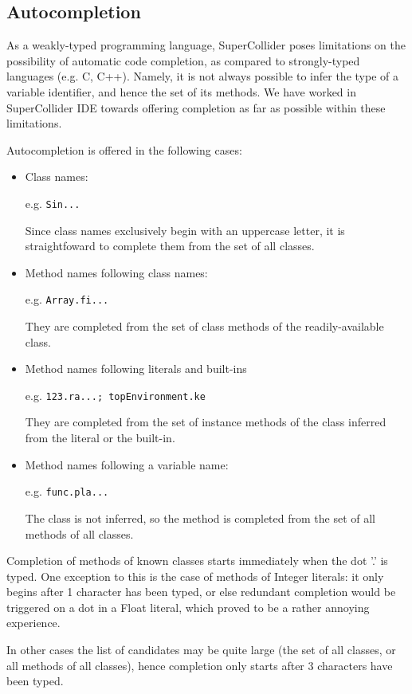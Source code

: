 \documentclass[11pt,a4paper]{article}
\begin{document}
\subsection{Autocompletion}

As a weakly-typed programming language, SuperCollider poses limitations on the possibility of
automatic code completion, as compared to strongly-typed languages (e.g. C, C++). Namely, it is
not always possible to infer the type of a variable identifier, and hence the set of its methods. We
have worked in SuperCollider IDE towards offering completion as far as possible within these limitations.

Autocompletion is offered in the following cases:
\begin{itemize}
 \item Class names:
 
 e.g. \verb|Sin...|
 
 Since class names exclusively begin with an uppercase letter, it is straightfoward
 to complete them from the set of all classes.
 
 \item Method names following class names:
 
 e.g. \verb|Array.fi...|
 
 They are completed from the set of class methods of the
 readily-available class.
 
 \item Method names following literals and built-ins
 
 e.g. \verb|123.ra...; topEnvironment.ke|
 
 They are completed from the set of instance methods of the class
 inferred from the literal or the built-in.
 
 \item Method names following a variable name:
 
 e.g. \verb|func.pla...|
 
 The class is not inferred, so the method is completed from the set of all methods of all classes.
 
\end{itemize}

Completion of methods of known classes starts immediately when the dot '.' is typed. One exception
to this is the case of methods of Integer literals: it only begins after 1 character has been
typed, or else redundant completion would be triggered on a dot in a Float literal, which proved
to be a rather annoying experience.

In other cases the list of candidates may be quite large (the set of all classes, or all methods of
all classes), hence completion only starts after 3 characters have been typed.
\end{document}
